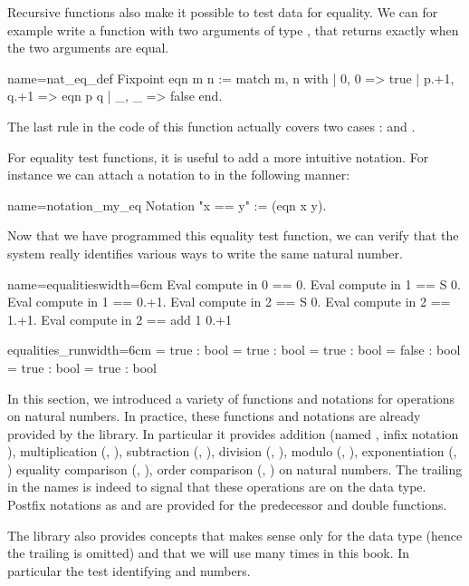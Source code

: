 Recursive functions also make it possible to test data for
equality. We can for example write a function with two arguments of
type , that
returns  exactly when the two arguments are equal.

\begin{coq}{name=nat_eq_def}{}
Fixpoint eqn m n :=
  match m, n with
  | 0, 0 => true
  | p.+1, q.+1 => eqn p q
  | _, _ => false
  end.
\end{coq}
The last rule in the code of this function actually covers two cases :
 and .

For equality test functions, it is useful to add a more intuitive
notation.  For instance we can attach a notation to  in
the following manner:

\begin{coq}{name=notation_my_eq}{}
Notation "x == y" := (eqn x y).
\end{coq}
Now
that we have programmed this equality test function, we can verify
that the \Coq{} system really identifies various ways to write the same
natural number.

\begin{coq}{name=equalities}{width=6cm}
Eval compute in 0 == 0.
Eval compute in 1 == S 0.
Eval compute in 1 == 0.+1.
Eval compute in 2 == S 0.
Eval compute in 2 == 1.+1.
Eval compute in 2 == add 1 0.+1
\end{coq}
\begin{coqout}{equalities_run}{width=6cm}
= true : bool
= true : bool
= true : bool
= false : bool
= true : bool
= true : bool
\end{coqout}

In this section, we introduced a variety of functions and notations
for operations on natural numbers.  In practice, these functions and
notations are already provided by the \mcbMC{} library.  In particular
it provides addition (named , infix notation \C{+}), 
multiplication
(, \C{*}), subtraction (, \C{-}), division (,
\C{\%/}),  modulo (, \C{\%\%}), exponentiation (, \C{\^})
equality comparison (, \C{==}), order
comparison (, \C{<=}) on natural numbers.  The trailing  in
the names is indeed to signal that these operations are on the  data
type.  Postfix notations as  and  are provided for
the predecessor and double functions.

The \mcbMC{} library also provides concepts that makes sense only
for the  data type (hence the trailing  is omitted) and
that we will use many times in this book.  In particular the
test identifying  and  numbers.


